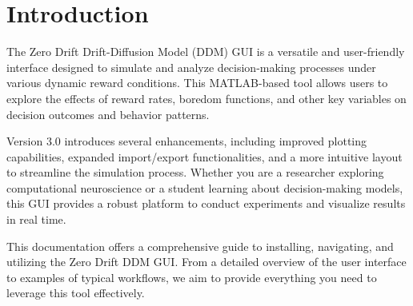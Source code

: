 \chapter{Introduction}
The Zero Drift Drift-Diffusion Model (DDM) GUI is a versatile and user-friendly interface designed to simulate and analyze decision-making processes under various dynamic reward conditions. This MATLAB-based tool allows users to explore the effects of reward rates, boredom functions, and other key variables on decision outcomes and behavior patterns.

Version 3.0 introduces several enhancements, including improved plotting capabilities, expanded import/export functionalities, and a more intuitive layout to streamline the simulation process. Whether you are a researcher exploring computational neuroscience or a student learning about decision-making models, this GUI provides a robust platform to conduct experiments and visualize results in real time.

This documentation offers a comprehensive guide to installing, navigating, and utilizing the Zero Drift DDM GUI. From a detailed overview of the user interface to examples of typical workflows, we aim to provide everything you need to leverage this tool effectively.